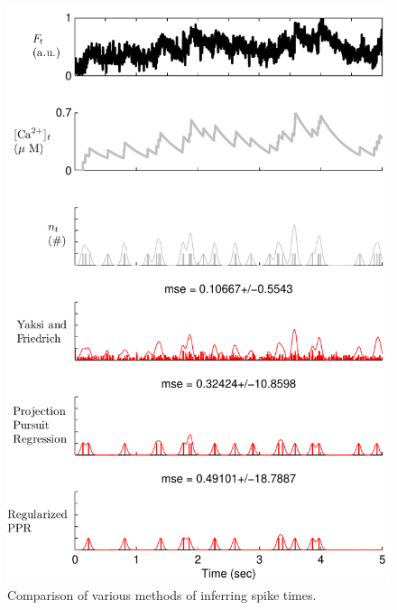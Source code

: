 \documentclass[12pt]{article}
\begin{document}
\begin{figure}
\includegraphics[width=1.0\linewidth]{comp1}
\caption{Comparison of various methods of inferring spike times. %
} \label{fig:comp}
\end{figure}
\end{document}
